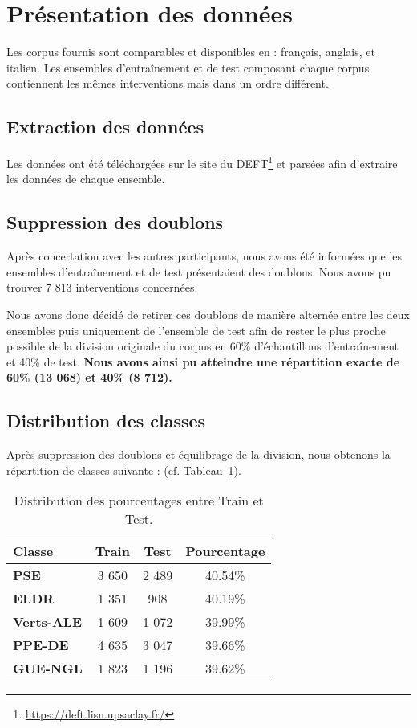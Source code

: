 \documentclass[11pt]{article}
\begin{document}


\section{Présentation des données}
Les corpus fournis sont comparables et disponibles en : français, anglais, et italien. Les ensembles d'entraînement et de test composant chaque corpus contiennent les mêmes interventions mais dans un ordre différent. 

\subsection{Extraction des données}
Les données ont été téléchargées sur le site du DEFT\footnote{\url{https://deft.lisn.upsaclay.fr/}} et parsées afin d'extraire les données de chaque ensemble. 

\subsection{Suppression des doublons}
Après concertation avec les autres participants, nous avons été informées que les ensembles d'entraînement et de test présentaient des doublons. Nous avons pu trouver 7 813 interventions concernées.

Nous avons donc décidé de retirer ces doublons de manière alternée entre les deux ensembles puis uniquement de l'ensemble de test afin de rester le plus proche possible de la division originale du corpus en 60\% d'échantillons d'entraînement et 40\% de test. \textbf{Nous avons ainsi pu atteindre une répartition exacte de 60\% (13 068) et 40\% (8 712).}

\subsection{Distribution des classes}
Après suppression des doublons et équilibrage de la division, nous obtenons la répartition de classes suivante : (cf. Tableau~\ref{tab:pourcentage_test}).

\begin{table}[ht]
\centering
    \begin{tabular}{lccc}
        \toprule
        \textbf{Classe}   & \textbf{Train} & \textbf{Test} & \textbf{Pourcentage} \\ \midrule
        \textbf{PSE}      & 3 650           & 2 489          & 40.54\% \\    
        \textbf{ELDR}     & 1 351           & 908           & 40.19\% \\          
        \textbf{Verts-ALE}& 1 609           & 1 072          & 39.99\% \\          
        \textbf{PPE-DE}   & 4 635           & 3 047          & 39.66\% \\          
        \textbf{GUE-NGL}  & 1 823           & 1 196          & 39.62\%  \\ 
        \bottomrule            
    \end{tabular}
    \caption{Distribution des pourcentages entre Train et Test.}
    \label{tab:pourcentage_test} %
\end{table}
\end{document}
